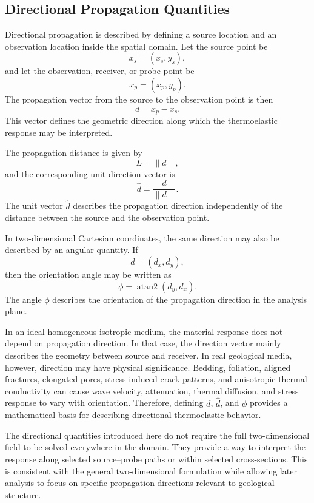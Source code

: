 \subsection{Directional Propagation Quantities}

Directional propagation is described by defining a source location and an observation location inside the spatial domain. Let the source point be
\begin{equation}
x_s
=
(x_s,y_s),
\end{equation}
and let the observation, receiver, or probe point be
\begin{equation}
x_p
=
(x_p,y_p).
\end{equation}
The propagation vector from the source to the observation point is then
\begin{equation}
\label{eq:propagation-vector}
d
=
x_p
-
x_s .
\end{equation}
This vector defines the geometric direction along which the thermoelastic response may be interpreted.

The propagation distance is given by
\begin{equation}
\label{eq:propagation-distance}
L
=
\|d\|,
\end{equation}
and the corresponding unit direction vector is
\begin{equation}
\label{eq:unit-direction}
\hat{d}
=
\frac{d}{\|d\|}.
\end{equation}
The unit vector \(\hat{d}\) describes the propagation direction independently of the distance between the source and the observation point.

In two-dimensional Cartesian coordinates, the same direction may also be described by an angular quantity. If
\begin{equation}
d
=
(d_x,d_y),
\end{equation}
then the orientation angle may be written as
\begin{equation}
\label{eq:propagation-angle}
\phi
=
\operatorname{atan2}(d_y,d_x).
\end{equation}
The angle \(\phi\) describes the orientation of the propagation direction in the analysis plane.

In an ideal homogeneous isotropic medium, the material response does not depend on propagation direction. In that case, the direction vector mainly describes the geometry between source and receiver. In real geological media, however, direction may have physical significance. Bedding, foliation, aligned fractures, elongated pores, stress-induced crack patterns, and anisotropic thermal conductivity can cause wave velocity, attenuation, thermal diffusion, and stress response to vary with orientation. Therefore, defining \(d\), \(\hat{d}\), and \(\phi\) provides a mathematical basis for describing directional thermoelastic behavior.

The directional quantities introduced here do not require the full two-dimensional field to be solved everywhere in the domain. They provide a way to interpret the response along selected source--probe paths or within selected cross-sections. This is consistent with the general two-dimensional formulation while allowing later analysis to focus on specific propagation directions relevant to geological structure.